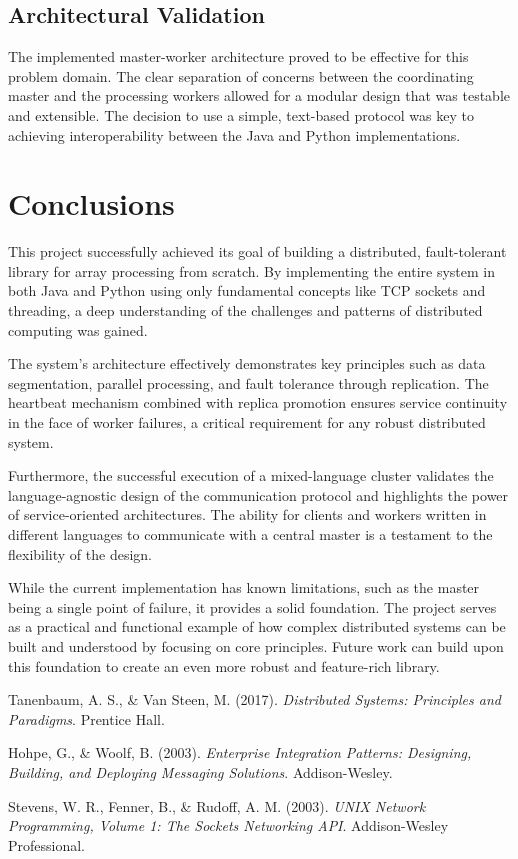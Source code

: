 \documentclass[10pt,a4paper]{article}
\theoremstyle{definition}
\theoremstyle{remark}
\begin{document}
\subsection{Architectural Validation}
The implemented master-worker architecture proved to be effective for this problem domain. The clear separation of concerns between the coordinating master and the processing workers allowed for a modular design that was testable and extensible. The decision to use a simple, text-based protocol was key to achieving interoperability between the Java and Python implementations.

\section{Conclusions}

This project successfully achieved its goal of building a distributed, fault-tolerant library for array processing from scratch. By implementing the entire system in both Java and Python using only fundamental concepts like TCP sockets and threading, a deep understanding of the challenges and patterns of distributed computing was gained.

The system's architecture effectively demonstrates key principles such as data segmentation, parallel processing, and fault tolerance through replication. The heartbeat mechanism combined with replica promotion ensures service continuity in the face of worker failures, a critical requirement for any robust distributed system.

Furthermore, the successful execution of a mixed-language cluster validates the language-agnostic design of the communication protocol and highlights the power of service-oriented architectures. The ability for clients and workers written in different languages to communicate with a central master is a testament to the flexibility of the design.

While the current implementation has known limitations, such as the master being a single point of failure, it provides a solid foundation. The project serves as a practical and functional example of how complex distributed systems can be built and understood by focusing on core principles. Future work can build upon this foundation to create an even more robust and feature-rich library.

\nocite{*}
\begin{thebibliography}{99}
 Tanenbaum, A. S., \& Van Steen, M. (2017). \textit{Distributed Systems: Principles and Paradigms}. Prentice Hall.

 Hohpe, G., \& Woolf, B. (2003). \textit{Enterprise Integration Patterns: Designing, Building, and Deploying Messaging Solutions}. Addison-Wesley.

 Stevens, W. R., Fenner, B., \& Rudoff, A. M. (2003). \textit{UNIX Network Programming, Volume 1: The Sockets Networking API}. Addison-Wesley Professional.
\end{thebibliography}
\end{document}
